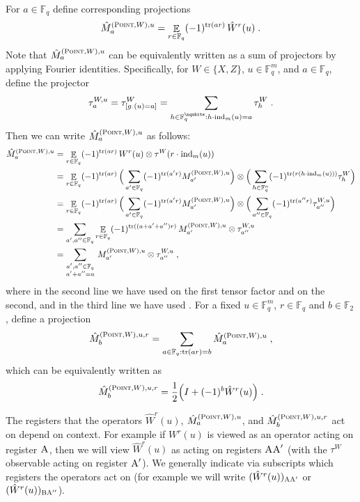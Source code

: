 \documentclass[11pt]{article}
\theoremstyle{definition}
\newcommand{\Id}{\ensuremath{I}}
\newcommand{\F}{\ensuremath{\mathbb{F}}}
\newcommand{\ind}{\ensuremath{\mathrm{ind}}}
\DeclareMathOperator{\tr}{tr}
\newcommand{\E}{\mathop{\mathbb{E}}\displaylimits}
\newcommand{\labelstyle}[1]{\ensuremath{\textsc{#1}}\xspace}
\newcommand{\alice}{\labelstyle{A}}
\newcommand{\bob}{\labelstyle{B}}
\newcommand{\typestyle}[1]{\ensuremath{\textsc{#1}}\xspace}
\newcommand{\Point}{\typestyle{Point}}
\begin{document}
For $a\in \F_q$ define corresponding projections
\[
	\hat{M}^{(\Point,W),u}_a = \E_{r \in \F_q} (-1)^{\tr(ar)} \, \hat{W}^r(u)\;.
\]
Note that $\hat{M}^{(\Point,W),u}_a$ can be equivalently
written as a sum of projectors by applying Fourier
identities. Specifically, for $W \in \{X, Z\}$, $u \in \F_q^{m}$, and
$a \in \F_q$, define the projector
\begin{equation} \tau^{W, u}_{a} =
  \tau^{W}_{[ g_{\cdot}(u) = a]} = \sum_{h \in \F_q^{\nqubits}: h
    \cdot \ind_m(u) = a} \tau^{W}_{h}\;. \label{eq:qld-point-obs-def} \end{equation}
Then we can write $\hat{M}^{(\Point, W), u}_a$ as follows:
\begin{align*}
  \hat{M}^{(\Point,W),u}_a
  &= \E_{r \in \F_q} (-1)^{\tr(ar)} \,
    W^r(u) \otimes \tau^W(r
    \cdot \ind_m(u)) \\
    &= \E_{r \in \F_q}
    (-1)^{\tr(ar)} \, \Big(\sum_{a' \in \F_q}(-1)^{\tr (a' r)} M^{(\Point,W),u}_{a'}
    \Big) \otimes \Big(
    \sum_{h \in \F_q^n}
    (-1)^{\tr( r( h \cdot \ind_m(u)))} \tau^{W}_{h} \Big) \\
  &= \E_{r \in \F_q}
    (-1)^{\tr(ar)} \, \Big(\sum_{a' \in \F_q}(-1)^{\tr (a' r)} M^{(\Point,W),u}_{a'}
    \Big) \otimes \Big(
    \sum_{a'' \in \F_q}
    (-1)^{\tr(a'' r)} \tau^{W,u}_{a''} \Big) \\
  &=	\sum_{a',a'' \in \F_q} \E_{r \in \F_q} (-1)^{\tr((a + a' + a'')r)} \, M^{(\Point,W),u}_{a'}  \otimes \tau^{W,u}_{a''} \\
  &= \sum_{\substack{a',a'' \in \F_q \\ a' + a'' = a}}  \, M^{(\Point,W),u}_{a'}  \otimes \tau^{W,u}_{a''}\;,
\end{align*}
where in the second line we have used  on the
first tensor factor and  on the second, and in the third line we
have used .
For a fixed $u\in\F_q^m$, $r \in \F_q$ and $b \in \F_2$, define a projection
\begin{equation}
	\hat{M}^{(\Point,W),u,r}_b = \sum_{a \in \F_q : \tr(ar) = b}
        \hat{M}^{(\Point,W),u}_a\;, \label{eq:qld-def-mptur}
\end{equation}
which can be equivalently written as
\begin{equation}\label{eq:lc-22}
\hat{M}^{(\Point,W),u,r}_b = \frac{1}{2} \Big ( \Id + (-1)^b \hat{W}^r(u) \Big)\;.
\end{equation}

The registers that the operators $\hat{W}^r(u)$,
$\hat{M}^{(\Point,W),u}_a$, and $\hat{M}^{(\Point,W),u,r}_b$ act on
depend on context. For example if $W^r(u)$ is viewed as an operator
acting on register $\alice$, then we will view $\hat{W}^r(u)$ as
acting on registers $\alice \alice'$ (with the $\tau^W$ observable
acting on register $\alice'$). We generally indicate via subscripts
which registers the operators act on (for example we will write
$(\hat{W}^r(u))_{\alice \alice'}$ or $(\hat{W}^r(u))_{\bob
  \alice''}$).
\end{document}
